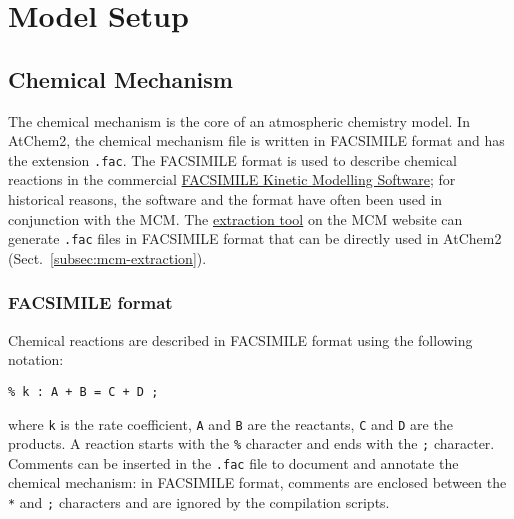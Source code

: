 %
%
%
%

\chapter{Model Setup} \label{ch:setup}

\section{Chemical Mechanism} \label{sec:chemical-mechanism}

The chemical mechanism is the core of an atmospheric chemistry
model. In AtChem2, the chemical mechanism file is written in FACSIMILE
format and has the extension \texttt{.fac}. The FACSIMILE format is
used to describe chemical reactions in the commercial
\href{http://www.mcpa-software.com/}{FACSIMILE Kinetic Modelling Software};
for historical reasons, the software and the format have often
been used in conjunction with the MCM. The
\href{http://mcm.leeds.ac.uk/MCM/extract.htt}{extraction tool} on the
MCM website can generate \texttt{.fac} files in FACSIMILE format that
can be directly used in AtChem2 (Sect.~\ref{subsec:mcm-extraction}).

\subsection{FACSIMILE format} \label{subsec:facsimile-format}

Chemical reactions are described in FACSIMILE format using the
following notation:

\begin{verbatim}
% k : A + B = C + D ;
\end{verbatim}

where \texttt{k} is the rate coefficient, \texttt{A} and \texttt{B}
are the reactants, \texttt{C} and \texttt{D} are the products. A
reaction starts with the \texttt{\%} character and ends with the
\texttt{;} character. Comments can be inserted in the \texttt{.fac}
file to document and annotate the chemical mechanism: in FACSIMILE
format, comments are enclosed between the \texttt{*} and \texttt{;}
characters and are ignored by the compilation scripts.

